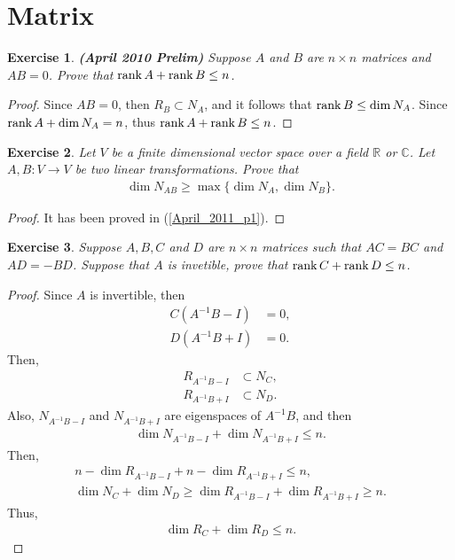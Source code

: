 \documentclass[11pt]{book}
\newtheorem{exercise}{Exercise}[section]
\theoremstyle{definition}
\numberwithin{equation}{chapter}
\begin{document}
\medskip

\section{Matrix}
\begin{exercise}{\bf (April 2010 Prelim)}
Suppose $A$ and $B$ are $n \times n$ matrices and $AB = 0$. Prove that $\rank A + \rank B \leq n$.
\end{exercise}
\begin{proof}
Since $AB = 0$, then $R_B \subset N_A$, and it follows that $\rank B \leq \dim N_A$. Since $\rank A + \dim N_A = n$, thus $\rank A + \rank B \leq n$.
\end{proof}

\medskip

\begin{exercise}
Let $V$ be a finite dimensional vector space over a field $\mathbb{R}$ or $\mathbb{C}$. Let $A, B: V \to V$ be two linear transformations. Prove that
\begin{align*}
    \dim N_{AB} \geq \max\{\dim N_A, \dim N_B\}.
\end{align*}
\end{exercise}
\begin{proof}
It has been proved in (\ref{April_2011_p1}).
\end{proof}

\medskip

\begin{exercise}
Suppose $A, B, C$ and $D$ are $n \times n$ matrices such that $AC = BC$ and $AD = - BD$. Suppose that $A$ is invetible, prove that $\rank C + \rank D \leq n$.
\end{exercise}
\begin{proof}
Since $A$ is invertible, then
\begin{align*}
    C\left(A^{-1} B - I \right) & = 0, \\
    D\left(A^{-1} B + I \right) & = 0.
\end{align*}
Then, 
\begin{align*}
    R_{A^{-1} B - I} & \subset N_C, \\
    R_{A^{-1} B + I} & \subset N_D.
\end{align*}
Also, $N_{A^{-1} B - I}$ and $N_{A^{-1} B + I}$ are eigenspaces of $A^{-1}B$, and then
\begin{align*}
    \dim N_{A^{-1} B - I} + \dim N_{A^{-1} B + I} \leq n.
\end{align*}
Then, 
\begin{align*}
    n - \dim R_{A^{-1} B - I} + n - \dim R_{A^{-1} B + I} \leq n, \\
    \dim N_C + \dim N_D \geq \dim R_{A^{-1} B - I} + \dim R_{A^{-1} B + I} \geq n.
\end{align*}
Thus, 
\begin{align*}
    \dim R_C + \dim R_D \leq n.
\end{align*}
\end{proof}
\end{document}
